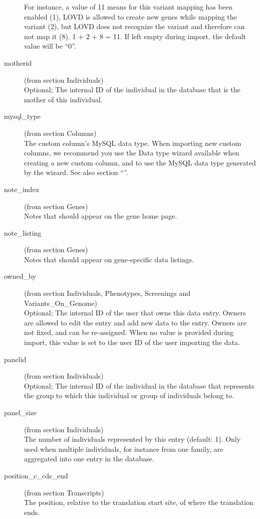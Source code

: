 \begin{description}
  For instance, a value of 11 means for this variant mapping has been enabled (1), LOVD is allowed to create new genes
    while mapping the variant (2), but LOVD does not recognize the variant and therefore can not map it (8). 1 + 2 + 8
    = 11.
  If left empty during import, the default value will be ``0''.
  \item[motherid] (from section Individuals)\hfill \\
  Optional; The internal ID of the individual in the database that is the mother of this individual.
  \item[mysql\_type] (from section Columns)\hfill \\
  The custom column's MySQL data type.
  When importing new custom columns, we recommend you use the Data type wizard available
   when creating a new custom column, and to use the MySQL data type generated by the wizard.
  See also section ``''.
  \item[note\_index] (from section Genes)\hfill \\
  Notes that should appear on the gene home page.
  \item[note\_listing] (from section Genes)\hfill \\
  Notes that should appear on gene-specific data listings.
  \item[owned\_by] (from section Individuals, Phenotypes, Screenings and Variants\_On\_Genome)\hfill \\
  Optional; The internal ID of the user that owns this data entry.
  Owners are allowed to edit the entry and add new data to the entry.
  Owners are not fixed, and can be re-assigned.
  When no value is provided during import, this value is set to the user ID of the user importing the data.
  \item[panelid] (from section Individuals)\hfill \\
  Optional; The internal ID of the individual in the database that represents the group
   to which this individual or group of individuals belong to.
  \item[panel\_size] (from section Individuals)\hfill \\
  The number of individuals represented by this entry (default: 1).
  Only used when multiple individuals, for instance from one family, are aggregated into one entry in the database.
  \item[position\_c\_cds\_end] (from section Transcripts)\hfill \\
  The position, relative to the translation start site, of where the translation ends.

\end{description}
